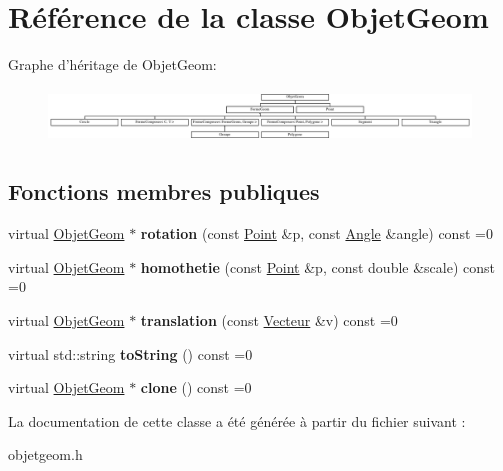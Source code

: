 \hypertarget{class_objet_geom}{\section{Référence de la classe Objet\+Geom}
\label{class_objet_geom}
}
Graphe d'héritage de Objet\+Geom\+:\begin{figure}[H]
\begin{center}
\leavevmode
\includegraphics[height=1.447028cm]{class_objet_geom}
\end{center}
\end{figure}
\subsection*{Fonctions membres publiques}
\begin{DoxyCompactItemize}
\item 
\hypertarget{class_objet_geom_afee16245fc1bdf9ecd84e3b9eee28eda}{virtual \hyperlink{class_objet_geom}{Objet\+Geom} $\ast$ {\bfseries rotation} (const \hyperlink{class_point}{Point} \&p, const \hyperlink{class_angle}{Angle} \&angle) const =0}\label{class_objet_geom_afee16245fc1bdf9ecd84e3b9eee28eda}

\item 
\hypertarget{class_objet_geom_a5226444eaac635d6eda0b4b3738ca9f4}{virtual \hyperlink{class_objet_geom}{Objet\+Geom} $\ast$ {\bfseries homothetie} (const \hyperlink{class_point}{Point} \&p, const double \&scale) const =0}\label{class_objet_geom_a5226444eaac635d6eda0b4b3738ca9f4}

\item 
\hypertarget{class_objet_geom_a42e5bc7bc7c1b187daa45f4fc397ae99}{virtual \hyperlink{class_objet_geom}{Objet\+Geom} $\ast$ {\bfseries translation} (const \hyperlink{class_vecteur}{Vecteur} \&v) const =0}\label{class_objet_geom_a42e5bc7bc7c1b187daa45f4fc397ae99}

\item 
\hypertarget{class_objet_geom_ab70623d99c3a6646f5b6f8a94adf1246}{virtual std\+::string {\bfseries to\+String} () const =0}\label{class_objet_geom_ab70623d99c3a6646f5b6f8a94adf1246}

\item 
\hypertarget{class_objet_geom_ae86398cfaa3852ec5f604102d3a2684c}{virtual \hyperlink{class_objet_geom}{Objet\+Geom} $\ast$ {\bfseries clone} () const =0}\label{class_objet_geom_ae86398cfaa3852ec5f604102d3a2684c}

\end{DoxyCompactItemize}


La documentation de cette classe a été générée à partir du fichier suivant \+:\begin{DoxyCompactItemize}
\item 
objetgeom.\+h\end{DoxyCompactItemize}

